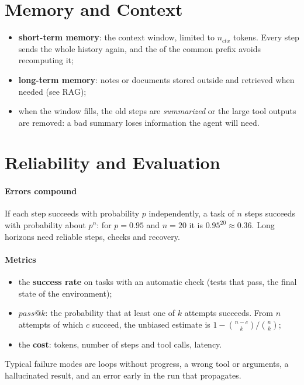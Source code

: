 \section{Memory and Context}
\begin{itemize}
    \item \textbf{short-term memory}: the context window, limited to $n_{ctx}$ tokens. Every
        step sends the whole history again, and the  of the common prefix avoids
        recomputing it;
    \item \textbf{long-term memory}: notes or documents stored outside and retrieved when
        needed (see RAG);
    \item when the window fills, the old steps are \emph{summarized} or the large tool
        outputs are removed: a bad summary loses information the agent will need.
\end{itemize}

\section{Reliability and Evaluation}
\paragraph{Errors compound}
If each step succeeds with probability $p$ independently, a task of $n$ steps succeeds with
probability about $p^{n}$: for $p=0.95$ and $n=20$ it is $0.95^{20}\approx0.36$. Long
horizons need reliable steps, checks and recovery.

\paragraph{Metrics}
\begin{itemize}
    \item the \textbf{success rate} on tasks with an automatic check (tests that pass, the
        final state of the environment);
    \item $pass@k$: the probability that at least one of $k$ attempts succeeds. From $n$
        attempts of which $c$ succeed, the unbiased estimate is
        $1-\binom{n-c}{k}\Big/\binom{n}{k}$;
    \item the \textbf{cost}: tokens, number of steps and tool calls, latency.
\end{itemize}
Typical failure modes are loops without progress, a wrong tool or arguments, a hallucinated
result, and an error early in the run that propagates.

